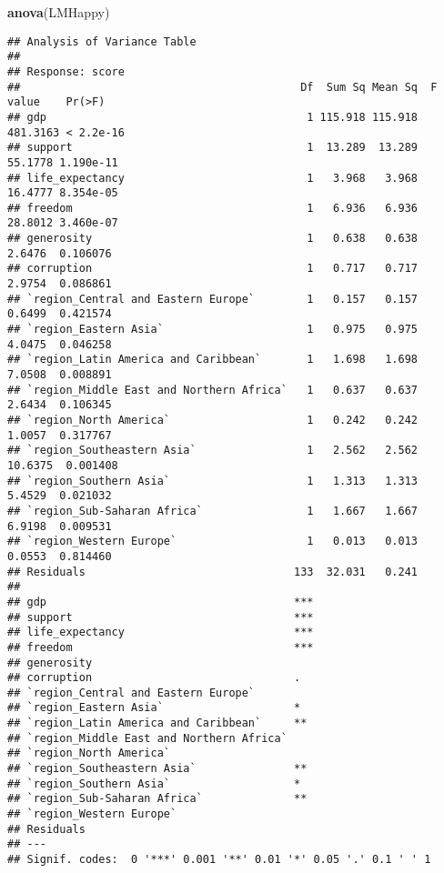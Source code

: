\documentclass[
]{article}
\newenvironment{Shaded}{\begin{snugshade}}{\end{snugshade}}
\newcommand{\FunctionTok}[1]{\textcolor[rgb]{0.13,0.29,0.53}{\textbf{#1}}}
\newcommand{\NormalTok}[1]{#1}
\begin{document}
\begin{Shaded}
\begin{Highlighting}[]
\FunctionTok{anova}\NormalTok{(LMHappy)}
\end{Highlighting}
\end{Shaded}

\begin{verbatim}
## Analysis of Variance Table
## 
## Response: score
##                                           Df  Sum Sq Mean Sq  F value    Pr(>F)
## gdp                                        1 115.918 115.918 481.3163 < 2.2e-16
## support                                    1  13.289  13.289  55.1778 1.190e-11
## life_expectancy                            1   3.968   3.968  16.4777 8.354e-05
## freedom                                    1   6.936   6.936  28.8012 3.460e-07
## generosity                                 1   0.638   0.638   2.6476  0.106076
## corruption                                 1   0.717   0.717   2.9754  0.086861
## `region_Central and Eastern Europe`        1   0.157   0.157   0.6499  0.421574
## `region_Eastern Asia`                      1   0.975   0.975   4.0475  0.046258
## `region_Latin America and Caribbean`       1   1.698   1.698   7.0508  0.008891
## `region_Middle East and Northern Africa`   1   0.637   0.637   2.6434  0.106345
## `region_North America`                     1   0.242   0.242   1.0057  0.317767
## `region_Southeastern Asia`                 1   2.562   2.562  10.6375  0.001408
## `region_Southern Asia`                     1   1.313   1.313   5.4529  0.021032
## `region_Sub-Saharan Africa`                1   1.667   1.667   6.9198  0.009531
## `region_Western Europe`                    1   0.013   0.013   0.0553  0.814460
## Residuals                                133  32.031   0.241                   
##                                             
## gdp                                      ***
## support                                  ***
## life_expectancy                          ***
## freedom                                  ***
## generosity                                  
## corruption                               .  
## `region_Central and Eastern Europe`         
## `region_Eastern Asia`                    *  
## `region_Latin America and Caribbean`     ** 
## `region_Middle East and Northern Africa`    
## `region_North America`                      
## `region_Southeastern Asia`               ** 
## `region_Southern Asia`                   *  
## `region_Sub-Saharan Africa`              ** 
## `region_Western Europe`                     
## Residuals                                   
## ---
## Signif. codes:  0 '***' 0.001 '**' 0.01 '*' 0.05 '.' 0.1 ' ' 1
\end{verbatim}
\end{document}
